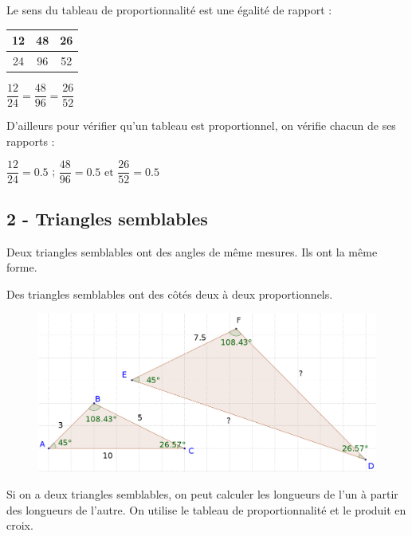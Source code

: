 \documentclass[11pt]{article}
\begin{document}
Le sens du tableau de proportionnalité est une égalité de rapport :

\begin{multicols}{2}

  \begin{center}
    \begin{tabular}{|c|c|c|}
      \hline
      12 & 48 & 26 \\  \hline
      24 & 96 & 52 \\  \hline
    \end{tabular}
  \end{center}

  \begin{center} $\dfrac{12}{24} = \dfrac{48}{96} = \dfrac{26}{52}$ \end{center}

\end{multicols}

D'ailleurs pour vérifier qu'un tableau est proportionnel, on vérifie chacun de ses rapports :

$\dfrac{12}{24} = 0.5$ ; $\dfrac{48}{96} = 0.5 \text{ et } \dfrac{26}{52} = 0.5$

\subsection*{2 - Triangles semblables}

\begin{Definition}
  Deux triangles semblables ont des angles de même mesures. \og Ils ont la même forme.\fg
\end{Definition}

\begin{Proposition}
  Des triangles semblables ont des côtés deux à deux proportionnels.
\end{Proposition}

\begin{figure}[H]
  \centering
  \includegraphics[width=0.6\linewidth]{3x6-thales/sources/tri-sem.png}
\end{figure}

Si on a deux triangles semblables, on peut calculer les longueurs de l'un à partir des longueurs de l'autre. On utilise le tableau de proportionnalité et le produit en croix.
\end{document}
